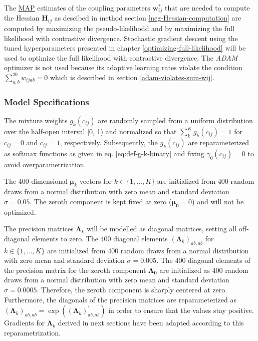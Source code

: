 \documentclass[11pt,a4paper,twoside]{book}
\newcommand{\eq}{\!=\!}
\renewcommand{\H}{\mathbf{H}}
\newcommand{\Hij}{\H_{ij}}
\newcommand{\Lk}{\mathbf{\Lambda}_k}
\newcommand{\muk}{\mathbf{\mu}_k}
\newcommand{\cij}{c_{ij}}
\newcommand{\wij}{\mathbf{w}_{ij}}
\newcommand{\wijab}{w_{ijab}}
\theoremstyle{definition}
\theoremstyle{definition}
\theoremstyle{remark}
\begin{document}
The \protect\hyperlink{abbrev}{MAP} estimates of the coupling parameters
\(\wij^*\) that are needed to compute the Hessian \(\Hij\) as descibed
in method section \ref{neg-Hessian-computation} are computed by
maximizing the pseudo-likelihodd and by maximizing the full likelihood
with contrastive divergence. Stochastic gradient descent using the tuned
hyperparameters presented in chapter \ref{optimizing-full-likelihood}
will be used to optimize the full likelihood with contrastive
divergence. The \emph{ADAM} optimizer is not used because its adaptive
learning rates violate the condition \(\sum_{a,b}^{20} \wijab = 0\)
which is described in section \ref{adam-violates-sum-wij}.

\subsubsection{Model
Specifications}\label{model-specifications-training-bayesian-model}

The mixture weights \(g_k(\cij)\) are randomly sampled from a uniform
distribution over the half-open interval {[}0, 1) and normalized so that
\(\sum_k^K g_k(\cij) = 1\) for \(\cij=0\) and \(\cij=1\), respectively.
Subsequently, the \(g_k(\cij)\) are reparameterized as softmax functions
as given in eq. \eqref{eq:def-g-k-binary} and fixing \(\gamma_0(\cij)=0\)
to avoid overparametrization.

The 400 dimensional \(\muk\) vectors for \(k \in \{1, \ldots, K\}\) are
initialized from 400 random draws from a normal distribution with zero
mean and standard deviation \(\sigma \eq 0.05\). The zeroth component is
kept fixed at zero (\(\mathbf{\mu_0} \eq 0\)) and will not be optimized.

The precision matrices \(\Lk\) will be modelled as diagonal matrices,
setting all off-diagonal elements to zero. The 400 diagonal elements
\((\Lk)_{ab, ab}\) for \(k \in \{1, \ldots, K\}\) are initialized from
400 random draws from a normal distribution with zero mean and standard
deviation \(\sigma \eq 0.005\). The 400 diagonal elements of the
precision matrix for the zeroth component \(\mathbf{\Lambda_0}\) are
initialized as 400 random draws from a normal distribution with zero
mean and standard deviation \(\sigma \eq 0.0005\). Therefore, the zeroth
component is sharply centered at zero. Furthermore, the diagonals of the
precision matrices are reparameterized as
\((\Lk)_{ab, ab} = \exp((\Lk)_{ab, ab}^{\prime})\) in order to ensure
that the values stay positive. Gradients for \(\Lk\) derived in next
sections have been adapted according to this reparametrization.
\end{document}
